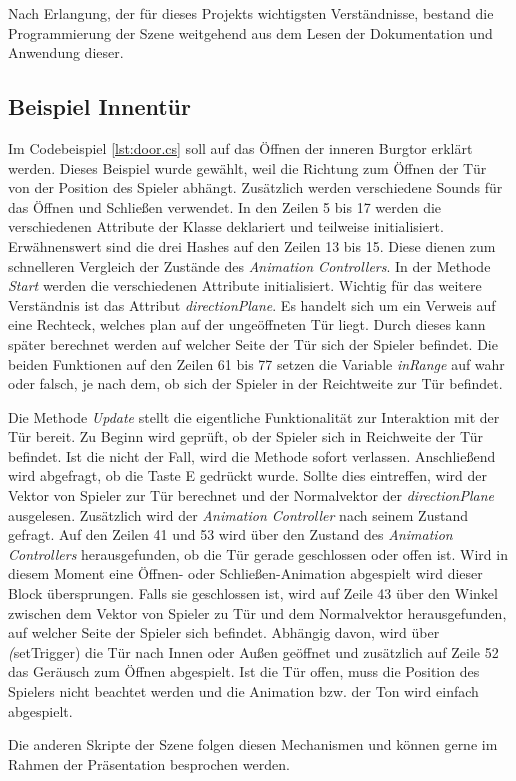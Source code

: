 Nach Erlangung, der für dieses Projekts wichtigsten Verständnisse, bestand die Programmierung der Szene weitgehend aus dem Lesen der Dokumentation und Anwendung dieser.

\subsection{Beispiel Innentür}


Im Codebeispiel \ref{lst:door.cs} soll auf das Öffnen der inneren Burgtor erklärt werden. Dieses Beispiel wurde gewählt, weil die Richtung zum Öffnen der Tür von der Position des Spieler abhängt. Zusätzlich werden verschiedene Sounds für das Öffnen und Schließen verwendet. In den Zeilen 5 bis 17 werden die verschiedenen Attribute der Klasse deklariert und teilweise initialisiert. Erwähnenswert sind die drei Hashes auf den Zeilen 13 bis 15. Diese dienen zum schnelleren Vergleich der Zustände des \textit{Animation Controllers}. In der Methode \textit{Start} werden die verschiedenen Attribute initialisiert. Wichtig für das weitere Verständnis ist das Attribut \textit{directionPlane}. Es handelt sich um ein Verweis auf eine Rechteck, welches plan auf der ungeöffneten Tür liegt. Durch dieses kann später berechnet werden auf welcher Seite  der Tür sich der Spieler befindet. Die beiden Funktionen auf den Zeilen 61 bis 77 setzen die Variable \textit{inRange} auf wahr oder falsch, je nach dem, ob sich der Spieler in der Reichtweite zur Tür befindet.

Die Methode \textit{Update} stellt die eigentliche Funktionalität zur Interaktion mit der Tür bereit. Zu Beginn wird geprüft, ob der Spieler sich in Reichweite der Tür befindet. Ist die nicht der Fall, wird die Methode sofort verlassen.
Anschließend wird abgefragt, ob die Taste E gedrückt wurde. Sollte dies eintreffen, wird der Vektor von Spieler zur Tür berechnet und der Normalvektor der \textit{directionPlane} ausgelesen. Zusätzlich wird der \textit{Animation Controller} nach seinem Zustand gefragt. Auf den Zeilen 41 und 53 wird über den Zustand des \textit{Animation Controllers} herausgefunden, ob die Tür gerade geschlossen oder offen ist. Wird in diesem Moment eine Öffnen- oder Schließen-Animation abgespielt wird dieser Block übersprungen. Falls sie geschlossen ist, wird auf Zeile 43 über den Winkel zwischen dem Vektor von Spieler zu Tür und dem Normalvektor herausgefunden, auf welcher Seite der Spieler sich befindet. Abhängig davon, wird über \textit(setTrigger) die Tür nach Innen oder Außen geöffnet und zusätzlich auf Zeile 52 das Geräusch zum Öffnen abgespielt. Ist die Tür offen, muss die Position des Spielers nicht beachtet werden und die Animation bzw. der Ton wird einfach abgespielt.  

Die anderen Skripte der Szene folgen diesen Mechanismen und können gerne im Rahmen der Präsentation besprochen werden.

  